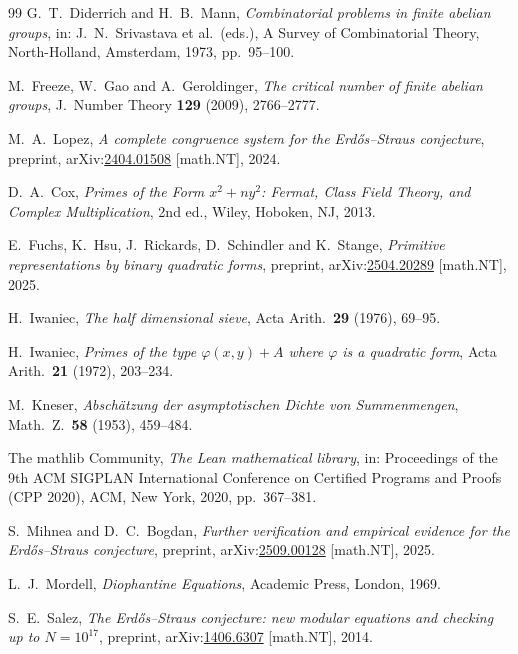 \documentclass[11pt]{article}
\theoremstyle{plain}
\theoremstyle{remark}
\theoremstyle{plain}
\numberwithin{equation}{section}
\begin{document}
\begin{thebibliography}{99}
G.~T.~Diderrich and H.~B.~Mann,
\emph{Combinatorial problems in finite abelian groups},
in: J.~N.~Srivastava et al.\ (eds.), A Survey of Combinatorial Theory,
North-Holland, Amsterdam, 1973, pp.~95--100.

M.~Freeze, W.~Gao and A.~Geroldinger,
\emph{The critical number of finite abelian groups},
J.~Number Theory \textbf{129} (2009), 2766--2777.

M.~A.~Lopez,
\emph{A complete congruence system for the Erd\H{o}s--Straus
conjecture},
preprint, arXiv:\href{https://arxiv.org/abs/2404.01508}{2404.01508}
[math.NT], 2024.

D.~A.~Cox,
\emph{Primes of the Form $x^2 + ny^2$: Fermat, Class Field Theory,
and Complex Multiplication},
2nd ed., Wiley, Hoboken, NJ, 2013.

E.~Fuchs, K.~Hsu, J.~Rickards, D.~Schindler and K.~Stange,
\emph{Primitive representations by binary quadratic forms},
preprint, arXiv:\href{https://arxiv.org/abs/2504.20289}{2504.20289}
[math.NT], 2025.

H.~Iwaniec,
\emph{The half dimensional sieve},
Acta Arith.\ \textbf{29} (1976), 69--95.

H.~Iwaniec,
\emph{Primes of the type $\varphi(x, y) + A$ where $\varphi$ is a
quadratic form},
Acta Arith.\ \textbf{21} (1972), 203--234.

M.~Kneser,
\emph{Absch\"atzung der asymptotischen Dichte von Summenmengen},
Math.\ Z.\ \textbf{58} (1953), 459--484.

The mathlib Community,
\emph{The Lean mathematical library},
in: Proceedings of the 9th ACM SIGPLAN International Conference on
Certified Programs and Proofs (CPP 2020),
ACM, New York, 2020, pp.~367--381.

S.~Mihnea and D.~C.~Bogdan,
\emph{Further verification and empirical evidence for the
Erd\H{o}s--Straus conjecture},
preprint, arXiv:\href{https://arxiv.org/abs/2509.00128}{2509.00128} [math.NT], 2025.

L.~J.~Mordell,
\emph{Diophantine Equations},
Academic Press, London, 1969.

S.~E.~Salez,
\emph{The Erd\H{o}s--Straus conjecture: new modular equations and
checking up to \mbox{$N = 10^{17}$}},
preprint, arXiv:\href{https://arxiv.org/abs/1406.6307}{1406.6307} [math.NT], 2014.


\end{thebibliography}
\end{document}
